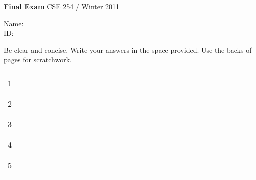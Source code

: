 \documentclass{article}[12pt]
\begin{document}
{\bf\Large Final Exam} \hfill CSE 254 / Winter 2011
\\

\vspace{.25in}

Name: \underline{\hspace{3in}}
\\

ID: \underline{\hspace{3.2in}}
\\

\vspace{1in}

Be clear and concise. Write your answers in the space provided. Use the backs of pages for scratchwork.

\vspace{1in}

\begin{center}
\begin{tabular}{|c|c|} \hline
\hspace{1in} & \hspace{1in} \\
1 & \\
 &  \\ \hline
& \\
2 & \\
& \\ \hline
& \\
3 & \\
& \\ \hline
& \\
4 & \\
& \\ \hline
& \\
5 & \\
& \\ \hline
\end{tabular}
\end{center}

\pagebreak
\end{document}
